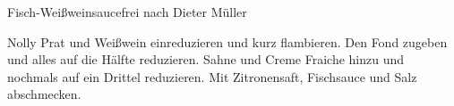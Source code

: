 \begin{recipe}{Fisch-Weißweinsauce}{frei nach Dieter Müller}
  \label{Fischsauce}
  \inglist
  
  \steps
  Nolly Prat und Weißwein einreduzieren und kurz flambieren. Den Fond zugeben und alles
  auf die Hälfte reduzieren. Sahne und Creme Fraiche hinzu und nochmals auf ein Drittel
  reduzieren. Mit Zitronensaft, Fischsauce und Salz abschmecken.
\end{recipe}
